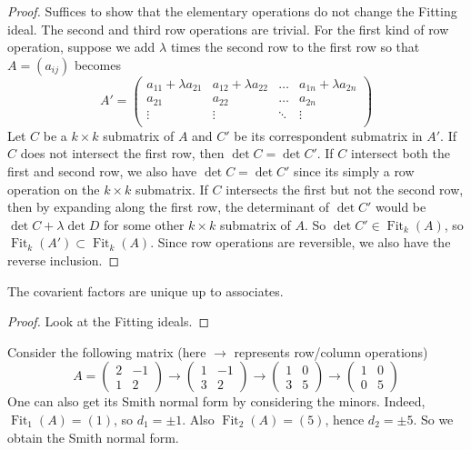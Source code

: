 \begin{proof}
    Suffices to show that the elementary operations do not change the Fitting ideal.
    The second and third row operations are trivial.
    For the first kind of row operation, suppose we add $\lambda$ times the second row to the first row so that $A=(a_{ij})$ becomes
    $$A'=\begin{pmatrix}
        a_11+\lambda a_{21}&a_{12}+\lambda a_{22}&\dots&a_{1n}+\lambda a_{2n}\\
        a_{21}&a_{22}&\dots&a_{2n}\\
        \vdots&\vdots&\ddots&\vdots\\
    \end{pmatrix}$$
    Let $C$ be a $k\times k$ submatrix of $A$ and $C'$ be its correspondent submatrix in $A'$.
    If $C$ does not intersect the first row, then $\det C=\det C'$.
    If $C$ intersect both the first and second row, we also have $\det C=\det C'$ since its simply a row operation on the $k\times k$ submatrix.
    If $C$ intersects the first but not the second row, then by expanding along the first row, the determinant of $\det C'$ would be $\det C+\lambda\det D$ for some other $k\times k$ submatrix of $A$.
    So $\det C'\in \operatorname{Fit}_k(A)$, so $\operatorname{Fit}_k(A')\subset \operatorname{Fit}_k(A)$.
    Since row operations are reversible, we also have the reverse inclusion.
\end{proof}
\begin{proposition}
    The covarient factors are unique up to associates.
\end{proposition}
\begin{proof}
    Look at the Fitting ideals.
\end{proof}
\begin{example}
    Consider the following matrix (here $\to$ represents row/column operations)
    $$A=\begin{pmatrix}
        2&-1\\
        1&2
    \end{pmatrix}\to\begin{pmatrix}
        1&-1\\
        3&2
    \end{pmatrix}\to\begin{pmatrix}
        1&0\\
        3&5
    \end{pmatrix}\to\begin{pmatrix}
        1&0\\
        0&5
    \end{pmatrix}$$
    One can also get its Smith normal form by considering the minors.
    Indeed, $\operatorname{Fit}_1(A)=(1)$, so $d_1=\pm 1$.
    Also $\operatorname{Fit}_2(A)=(5)$, hence $d_2=\pm 5$.
    So we obtain the Smith normal form.
\end{example}
